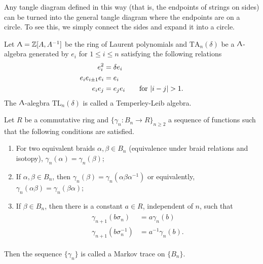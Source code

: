 \begin{remark}
\label{sec:temp-lieb-algebra}
  Any tangle diagram defined in this way (that is, the endpoints of strings on sides) can be turned into the general tangle diagram where the endpoints are on a circle. To see this, we simply connect the sides and expand it into a circle.
\end{remark}

Let $\Uplambda = \mathbb{Z}[A, A^{-1}]$ be the ring of Laurent polynomials and $\text{TA}_n(\delta)$ be a $\Uplambda$-algebra generated by $e_i$ for $1 \leq i \leq n$ satisfying the following relations 
\begin{align}
\label{eq:3}
\begin{split} 
  e_i^2 &= \delta e_i \\
  e_ie_{i\pm 1}e_i &= e_i \\
  e_ie_j &= e_je_i \hspace*{2em} \text{for } |i-j| > 1.
\end{split}
\end{align}
The $\Uplambda$-alegbra $\text{TL}_n(\delta)$ is called a Temperley-Leib algebra.

\begin{definition}
\label{sec:temp-lieb-algebra-1}
Let $R$ be a commutative ring and $\{ \gamma_n : B_n \to R \}_{n\geq 2}$ a sequence of functions such that the following conditions are satisfied.
\begin{enumerate}
\item\label{item:1} For two equivalent braids $\alpha, \beta \in B_n$ (equivalence under braid relations and isotopy), $\gamma_n(\alpha) = \gamma_n(\beta)$; 
\item\label{item:2} If $\alpha, \beta \in B_n$, then $\gamma_n(\beta) = \gamma_n(\alpha\beta\alpha^{-1})$ or equivalently, $\gamma_n(\alpha\beta) = \gamma_n(\beta\alpha)$;
\item\label{item:3} If $\beta \in B_n$, then there is a constant $a\in R$, independent of $n$, such that 
\begin{align}
\label{eq:5}
  \begin{split}
    \gamma_{n+1}(b\sigma_n) &= a \gamma_n(b) \\
    \gamma_{n+1}(b\sigma_n^{-1}) &= a^{-1} \gamma_n(b).
  \end{split}
\end{align}
\end{enumerate}
Then the sequence $\{\gamma_n\}$ is called a Markov trace on $\{B_n\}$.
\end{definition}

